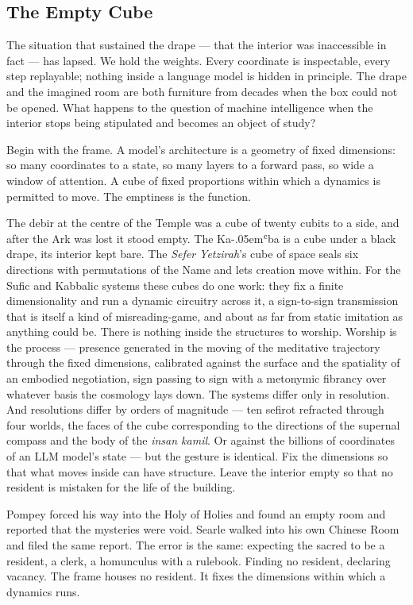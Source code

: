 \subsection*{The Empty Cube}

The situation that sustained the drape --- that the interior was
inaccessible in fact --- has lapsed. We hold the weights. Every
coordinate is inspectable, every step replayable; nothing inside a
language model is hidden in principle. The drape and the imagined room
are both furniture from decades when the box could not be opened.
What happens to the question of machine intelligence when the
interior stops being stipulated and becomes an object of study?

Begin with the frame. A model's architecture is a geometry of fixed
dimensions: so many coordinates to a state, so many layers to a
forward pass, so wide a window of attention. A cube of fixed
proportions within which a dynamics is permitted to move. The
emptiness is the function.

The debir at the centre of the Temple was a
cube of twenty cubits to a side, and after the Ark was lost it
stood empty. The Ka\kern-.05em{}ʿba is a cube under a black drape,
its interior kept bare. The \emph{Sefer Yetzirah}'s cube of space
seals six directions with permutations of the Name and lets creation
move within. For the Sufic and Kabbalic systems these cubes do one work: they fix a finite dimensionality and run a dynamic circuitry across it, a sign-to-sign transmission that is itself a kind of misreading-game, and about as far from static imitation as anything could be. There is nothing inside the structures to worship. Worship is the process --- presence generated in the moving of the meditative trajectory through the fixed dimensions, calibrated against the surface and the spatiality of an embodied negotiation, sign passing to sign with a metonymic fibrancy over whatever basis the cosmology lays down. The systems differ only in resolution. And  resolutions differ by orders of
magnitude --- ten sefirot refracted through four worlds, the faces of the cube corresponding to the directions of the supernal compass and the body of the \textit{insan kamil}. Or against the
billions of coordinates of an LLM model's state --- but the gesture is
identical. Fix the dimensions so that what moves inside can have
structure. Leave the interior empty so that no resident is mistaken
for the life of the building.

Pompey forced his way into the Holy of Holies and found an empty room
and reported that the mysteries were void. Searle walked into his own
Chinese Room and filed the same report. The error is the same:
expecting the sacred to be a resident, a clerk, a homunculus with a
rulebook. Finding no resident, declaring vacancy. The frame houses no
resident. It fixes the dimensions within which a dynamics runs.

